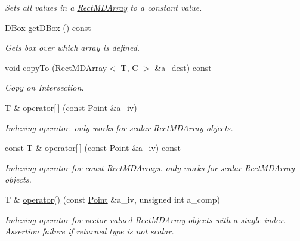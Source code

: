 \begin{DoxyCompactItemize}
\begin{DoxyCompactList}\small\item\em Sets all values in a \hyperlink{class_rect_m_d_array}{Rect\+M\+D\+Array} to a constant value. \end{DoxyCompactList}\item 
\mbox{\label{class_rect_m_d_array_aa57ff9b781e73d059f798868ed74a842}} 
\hyperlink{class_d_box}{D\+Box} \hyperlink{class_rect_m_d_array_aa57ff9b781e73d059f798868ed74a842}{get\+D\+Box} () const
\begin{DoxyCompactList}\small\item\em Gets box over which array is defined. \end{DoxyCompactList}\item 
void \hyperlink{class_rect_m_d_array_a19daaeb911b56032a2e3fe89717d8d27}{copy\+To} (\hyperlink{class_rect_m_d_array}{Rect\+M\+D\+Array}$<$ T, C $>$ \&a\+\_\+dest) const
\begin{DoxyCompactList}\small\item\em Copy on Intersection. \end{DoxyCompactList}\item 
T \& \hyperlink{class_rect_m_d_array_a19c1a43d52784a3b35e41fe1d7b70683}{operator\mbox{[}$\,$\mbox{]}} (const \hyperlink{class_point}{Point} \&a\+\_\+iv)
\begin{DoxyCompactList}\small\item\em Indexing operator. only works for scalar \hyperlink{class_rect_m_d_array}{Rect\+M\+D\+Array} objects. \end{DoxyCompactList}\item 
const T \& \hyperlink{class_rect_m_d_array_a32c67948460269cd7472db8d089e1198}{operator\mbox{[}$\,$\mbox{]}} (const \hyperlink{class_point}{Point} \&a\+\_\+iv) const
\begin{DoxyCompactList}\small\item\em Indexing operator for const Rect\+M\+D\+Arrays. only works for scalar \hyperlink{class_rect_m_d_array}{Rect\+M\+D\+Array} objects. \end{DoxyCompactList}\item 
T \& \hyperlink{class_rect_m_d_array_a362f76a454f2ec6455e5b7b78e51b04f}{operator()} (const \hyperlink{class_point}{Point} \&a\+\_\+iv, unsigned int a\+\_\+comp)
\begin{DoxyCompactList}\small\item\em Indexing operator for vector-\/valued \hyperlink{class_rect_m_d_array}{Rect\+M\+D\+Array} objects with a single index. Assertion failure if returned type is not scalar. \end{DoxyCompactList}\item 

\end{DoxyCompactItemize}
